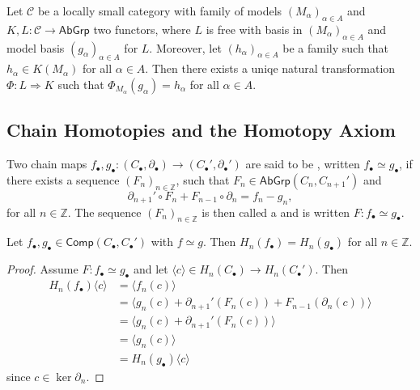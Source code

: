 \begin{proposition}
	Let $\mathcal{C}$ be a locally small category with family of models $(M_\alpha)_{\alpha \in A}$ and $K,L : \mathcal{C} \to \mathsf{AbGrp}$ two functors, where $L$ is free with basis in $(M_\alpha)_{\alpha \in A}$ and model basis $(g_\alpha)_{\alpha \in A}$ for $L$. Moreover, let $(h_\alpha)_{\alpha \in A}$ be a family such that $h_\alpha \in K(M_\alpha)$ for all $\alpha \in A$. Then there exists a uniqe natural transformation $\Phi : L \Rightarrow K$ such that $\Phi_{M_\alpha}(g_\alpha) = h_\alpha$ for all $\alpha \in A$.
\end{proposition}



\subsection*{Chain Homotopies and the Homotopy Axiom}
\begin{definition}
	Two chain maps $f_\bullet,g_\bullet : (C_\bullet,\partial_\bullet) \to (C_\bullet',\partial_\bullet')$ are said to be , written $f_\bullet \simeq g_\bullet$, if there exists a sequence $(F_n)_{n \in \mathbb{Z}}$, such that $F_n \in \mathsf{AbGrp}(C_n,C_{n + 1}')$ and 
	\begin{equation*}
		\partial_{n + 1}' \circ F_n + F_{n - 1} \circ \partial_n = f_n - g_n,
	\end{equation*}
	\noindent for all $n \in \mathbb{Z}$. The sequence $(F_n)_{n \in \mathbb{Z}}$ is then called a  and is written $F : f_\bullet \simeq g_\bullet$.
\end{definition}

\begin{proposition}
	\label{prop:inclusions}
	Let $f_\bullet,g_\bullet \in \mathsf{Comp}(C_\bullet,C_\bullet')$ with $f \simeq g$. Then $H_n(f_\bullet) = H_n(g_\bullet)$ for all $n \in \mathbb{Z}$.
\end{proposition}

\begin{proof}
	Assume $F : f_\bullet \simeq g_\bullet$ and let $\langle c \rangle \in H_n(C_\bullet) \to H_n(C_\bullet')$. Then
	\begin{align*}
		H_n(f_\bullet)\langle c \rangle &= \langle f_n(c) \rangle\\
		&= \langle g_n(c) + \partial_{n + 1}'(F_n(c)) + F_{n - 1}(\partial_n(c)) \rangle\\
		&= \langle g_n(c) + \partial_{n + 1}'(F_n(c)) \rangle\\
		&= \langle g_n(c) \rangle\\
		&= H_n(g_\bullet)\langle c \rangle
	\end{align*}
	\noindent since $c \in \ker \partial_n$.
\end{proof}

